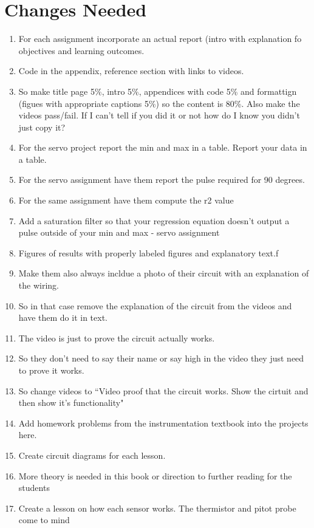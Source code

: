 \section{Changes Needed}

\begin{enumerate}[itemsep=-5pt]
\item For each assignment incorporate an actual report (intro with explanation fo objectives and learning outcomes.
\item Code in the appendix, reference section with links to videos.
\item So make title page 5\%, intro 5\%, appendices with code 5\% and formattign (figues with appropriate captions 5\%) so the content is 80\%. Also make the videos pass/fail. If I can't tell if you did it or not how do I know you didn't just copy it?
\item For the servo project report the min and max in a table. Report your data in a table.
\item For the servo assignment have them report the pulse required for 90 degrees.
\item For the same assignment have them compute the r2 value
\item Add a saturation filter so that your regression equation doesn't output a pulse outside of your min and max - servo assignment
\item Figures of results with properly labeled figures and explanatory text.f
\item Make them also always incldue a photo of their circuit with an explanation of the wiring.
\item So in that case remove the explanation of the circuit from the videos and have them do it in text.
\item The video is just to prove the circuit actually works.
\item So they don't need to say their name or say high in the video they just need to prove it works.
\item So change videos to ``Video proof that the circuit works. Show the cirtuit and then show it's functionality"
\item Add homework problems from the instrumentation textbook into the projects here. 
\item Create circuit diagrams for each lesson.
\item More theory is needed in this book or direction to further
  reading for the students
\item Create a lesson on how each sensor works. The thermistor and pitot probe come to mind 

\end{enumerate}
